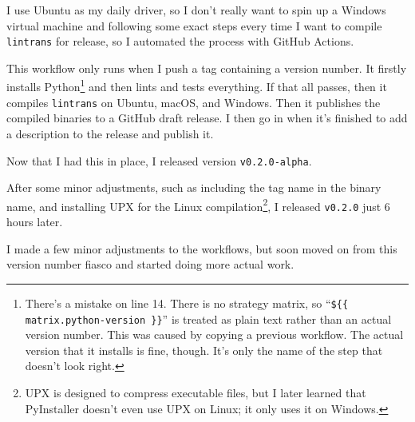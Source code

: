 \documentclass[../development.tex]{subfiles}
\begin{document}
I use Ubuntu as my daily driver, so I don't really want to spin up a Windows virtual machine and following some exact steps every time I want to compile \texttt{lintrans} for release, so I automated the process with GitHub Actions.


This workflow only runs when I push a tag containing a version number. It firstly installs Python\footnote{There's a mistake on line 14. There is no strategy matrix, so \enquote{\texttt{\$\{\{ matrix.python-version \}\}}} is treated as plain text rather than an actual version number. This was caused by copying a previous workflow. The actual version that it installs is fine, though. It's only the name of the step that doesn't look right.} and then lints and tests everything. If that all passes, then it compiles \texttt{lintrans} on Ubuntu, macOS, and Windows. Then it publishes the compiled binaries to a GitHub draft release. I then go in when it's finished to add a description to the release and publish it.

Now that I had this in place, I released version \texttt{v0.2.0-alpha}.

After some minor adjustments, such as including the tag name in the binary name, and installing UPX\cite{upx-github} for the Linux compilation\footnote{UPX is designed to compress executable files, but I later learned that PyInstaller doesn't even use UPX on Linux; it only uses it on Windows.}, I released \texttt{v0.2.0} just 6 hours later.

I made a few minor adjustments to the workflows, but soon moved on from this version number fiasco and started doing more actual work.
\end{document}
